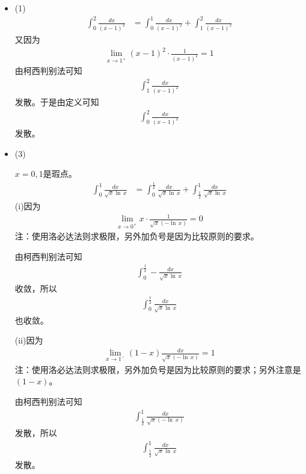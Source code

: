 \documentclass{article}
\begin{document}
\begin{itemize}
  \item (1)
        \begin{align*}
          \int_{0}^{2} \frac{dx}{(x - 1)^2}
           & = \int_{0}^{1} \frac{dx}{(x - 1)^2} + \int_{1}^{2} \frac{dx}{(x - 1)^2}
        \end{align*}
        又因为
        \begin{align*}
          \lim\limits_{x \to 1^+} (x - 1)^2 \cdot \frac{1}{(x - 1)^2} = 1
        \end{align*}
        由柯西判别法可知
        \begin{align*}
          \int_{1}^{2} \frac{dx}{(x - 1)^2}
        \end{align*}
        发散。于是由定义可知
        \begin{align*}
          \int_{0}^{2} \frac{dx}{(x - 1)^2}
        \end{align*}
        发散。

  \item (3)

        $x = 0, 1$是瑕点。
        \begin{align*}
          \int_{0}^{1} \frac{dx}{\sqrt{x} \ln\, x}
           & = \int_{0}^{\frac{1}{2}} \frac{dx}{\sqrt{x} \ln\, x} + \int_{\frac{1}{2}}^{1} \frac{dx}{\sqrt{x} \ln\, x}
        \end{align*}
        (i)因为
        \begin{align*}
          \lim\limits_{x \to 0^+} x \cdot \frac{1}{\sqrt{x} (-\ln\, x)} = 0
        \end{align*}
        注：使用洛必达法则求极限，另外加负号是因为比较原则的要求。

        由柯西判别法可知
        \begin{align*}
          \int_{0}^{\frac{1}{2}} -\frac{dx}{\sqrt{x} \ln\, x}
        \end{align*}
        收敛，所以
        \begin{align*}
          \int_{0}^{\frac{1}{2}} \frac{dx}{\sqrt{x} \ln\, x}
        \end{align*}
        也收敛。

        (ii)因为
        \begin{align*}
          \lim\limits_{x \to 1^-} (1 - x) \frac{dx}{\sqrt{x} (-\ln\, x)} = 1
        \end{align*}
        注：使用洛必达法则求极限，另外加负号是因为比较原则的要求；另外注意是$(1 - x)$。

        由柯西判别法可知
        \begin{align*}
          \int_{\frac{1}{2}}^{1} \frac{dx}{\sqrt{x} (-\ln\, x)}
        \end{align*}
        发散，所以
        \begin{align*}
          \int_{\frac{1}{2}}^{1} \frac{dx}{\sqrt{x} \ln\, x}
        \end{align*}
        发散。


\end{itemize}
\end{document}
